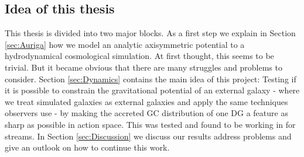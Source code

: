 \subsection{Idea of this thesis}
This thesis is divided into two major blocks. As a first step we explain in Section \ref{sec:Auriga} how we model an analytic axisymmetric potential to a hydrodynamical cosmological simulation. At first thought, this seems to be trivial. But it became obvious that there are many struggles and problems to consider. Section \ref{sec:Dynamics} contains the main idea of this project: Testing if it is possible to constrain the gravitational potential of an external galaxy - where we treat simulated galaxies as external galaxies and apply the same techniques observers use - by making the accreted \ac{GC} distribution of one \ac{DG} a feature as sharp as possible in action space. This was tested and found to be working in \citet{Sanderson...gravpotstreams...2017} for streams. In Section \ref{sec:Discussion} we discuss our results address problems and give an outlook on how to continue this work.